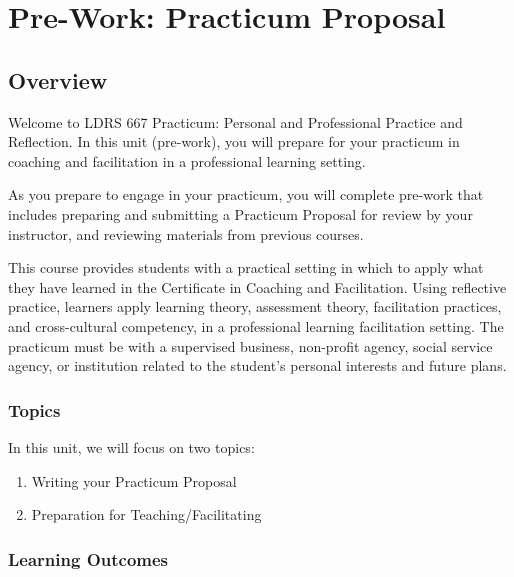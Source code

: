\documentclass[
]{book}
\providecommand{\tightlist}{%
  \setlength{\itemsep}{0pt}\setlength{\parskip}{0pt}}
\begin{document}
\hypertarget{pre-work-practicum-proposal}{%
\chapter*{Pre-Work: Practicum Proposal}\label{pre-work-practicum-proposal}}

\hypertarget{overview}{%
\section*{Overview}\label{overview}}

Welcome to LDRS 667 Practicum: Personal and Professional Practice and Reflection. In this unit (pre-work), you will prepare for your practicum in coaching and facilitation in a professional learning setting.

As you prepare to engage in your practicum, you will complete pre-work that includes preparing and submitting a Practicum Proposal for review by your instructor, and reviewing materials from previous courses.

This course provides students with a practical setting in which to apply what they have learned in the Certificate in Coaching and Facilitation. Using reflective practice, learners apply learning theory, assessment theory, facilitation practices, and cross-cultural competency, in a professional learning facilitation setting. The practicum must be with a supervised business, non-profit agency, social service agency, or institution related to the student's personal interests and future plans.

\hypertarget{topics}{%
\subsection*{Topics}\label{topics}}

In this unit, we will focus on two topics:

\begin{enumerate}
\def\labelenumi{\arabic{enumi}.}
\tightlist
\item
  Writing your Practicum Proposal\\
\item
  Preparation for Teaching/Facilitating
\end{enumerate}

\hypertarget{learning-outcomes}{%
\subsection*{Learning Outcomes}\label{learning-outcomes}}
\end{document}
